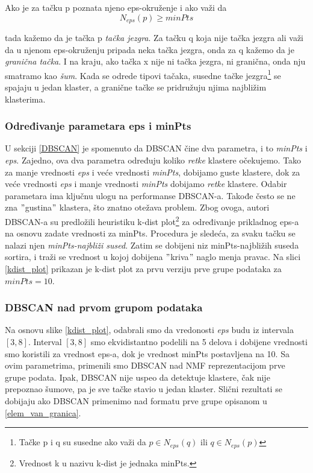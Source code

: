\documentclass[a4paper]{article}
\begin{document}
Ako je za tačku p poznata njeno eps-okruženje i ako važi da 
\begin{equation}
	N_{eps}(p) \geq minPts
\end{equation}

tada kažemo da je tačka p \textit{tačka jezgra}. Za tačku q koja nije tačka jezgra ali važi da u njenom eps-okruženju pripada neka tačka jezgra, onda za q kažemo da je \textit{granična tačka}. I na kraju, ako tačka x nije ni tačka jezgra, ni granična, onda nju smatramo kao \textit{šum}.
Kada se odrede tipovi tačaka, susedne tačke jezgra\footnote{Tačke p i q su susedne ako važi da $p \in N_{eps}(q)$ ili $q \in N_{eps}(p)$ } se spajaju u jedan klaster, a granične tačke se pridružuju njima najbližim klasterima.

\subsubsection{Određivanje parametara eps i minPts}
U sekciji \ref{DBSCAN} je spomenuto da DBSCAN čine dva parametra, i to \textit{minPts} i \textit{eps}. Zajedno, ova dva parametra određuju koliko \textit{retke} klastere očekujemo. Tako za manje vrednosti \textit{eps} i veće vrednosti \textit{minPts}, dobijamo guste klastere, dok za veće vrednosti \textit{eps} i manje vrednosti \textit{minPts} dobijamo \textit{retke} klastere. Odabir parametara ima ključnu ulogu na performanse DBSCAN-a. Takođe često se ne zna $"$gustina$"$ klastera, što znatno otežava problem. Zbog ovoga, autori DBSCAN-a su predložili heuristiku k-dist plot\footnote{Vrednost k u nazivu k-dist je jednaka minPts.} za određivanje prikladnog eps-a na osnovu zadate vrednosti za minPts. Procedura je sledeća, za svaku tačku se nalazi njen \textit{minPts-najbliži sused}. Zatim se dobijeni niz minPts-najbližih suseda sortira, i traži se vrednost u kojoj dobijena $"$kriva$"$ naglo menja pravac. Na slici \ref{kdist_plot} prikazan je k-dist plot za prvu verziju prve grupe podataka za $minPts = 10$.

\subsubsection{DBSCAN nad prvom grupom podataka}

Na osnovu slike \ref{kdist_plot}, odabrali smo da vredonosti \textit{eps} budu iz intervala $[3, 8]$. Interval $[3, 8]$ smo ekvidistantno podelili na 5 delova i dobijene vrednosti smo koristili za vrednost eps-a, dok je vrednost minPts postavljena na 10. Sa ovim parametrima, primenili smo DBSCAN nad NMF reprezentacijom prve grupe podata. Ipak, DBSCAN nije uspeo da detektuje klastere, čak nije prepoznao šumove, pa je sve tačke stavio u jedan klaster. Slični rezultati se dobijaju ako DBSCAN primenimo nad formatu prve grupe opisanom u \ref{elem_van_granica}. 
\end{document}
